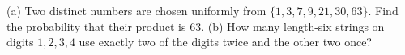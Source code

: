 (a) Two distinct numbers are chosen uniformly from $\{1,3,7,9,21,30,63\}$. Find the probability that their product is $63$. (b) How many length-six strings on digits $1,2,3,4$ use exactly two of the digits twice and the other two once?
